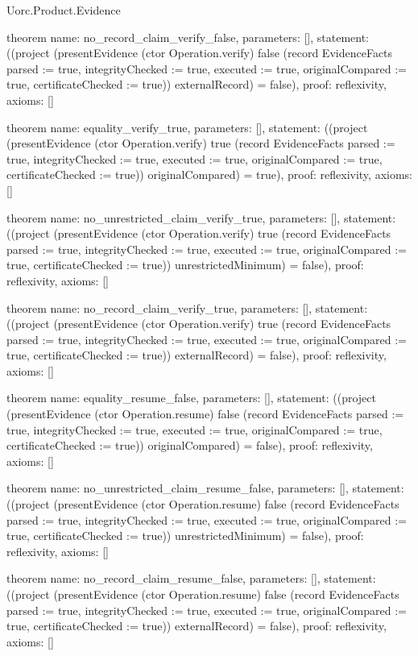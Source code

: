 \begin{lexlean}{Uorc.Product.Evidence}
\begin{semanticmodule}
theorem{
  name: no_record_claim_verify_false,
  parameters: [],
  statement: ((project (presentEvidence (ctor Operation.verify) false (record EvidenceFacts {parsed := true, integrityChecked := true, executed := true, originalCompared := true, certificateChecked := true})) externalRecord) = false),
  proof: reflexivity{},
  axioms: []
}

theorem{
  name: equality_verify_true,
  parameters: [],
  statement: ((project (presentEvidence (ctor Operation.verify) true (record EvidenceFacts {parsed := true, integrityChecked := true, executed := true, originalCompared := true, certificateChecked := true})) originalCompared) = true),
  proof: reflexivity{},
  axioms: []
}

theorem{
  name: no_unrestricted_claim_verify_true,
  parameters: [],
  statement: ((project (presentEvidence (ctor Operation.verify) true (record EvidenceFacts {parsed := true, integrityChecked := true, executed := true, originalCompared := true, certificateChecked := true})) unrestrictedMinimum) = false),
  proof: reflexivity{},
  axioms: []
}

theorem{
  name: no_record_claim_verify_true,
  parameters: [],
  statement: ((project (presentEvidence (ctor Operation.verify) true (record EvidenceFacts {parsed := true, integrityChecked := true, executed := true, originalCompared := true, certificateChecked := true})) externalRecord) = false),
  proof: reflexivity{},
  axioms: []
}

theorem{
  name: equality_resume_false,
  parameters: [],
  statement: ((project (presentEvidence (ctor Operation.resume) false (record EvidenceFacts {parsed := true, integrityChecked := true, executed := true, originalCompared := true, certificateChecked := true})) originalCompared) = false),
  proof: reflexivity{},
  axioms: []
}

theorem{
  name: no_unrestricted_claim_resume_false,
  parameters: [],
  statement: ((project (presentEvidence (ctor Operation.resume) false (record EvidenceFacts {parsed := true, integrityChecked := true, executed := true, originalCompared := true, certificateChecked := true})) unrestrictedMinimum) = false),
  proof: reflexivity{},
  axioms: []
}

theorem{
  name: no_record_claim_resume_false,
  parameters: [],
  statement: ((project (presentEvidence (ctor Operation.resume) false (record EvidenceFacts {parsed := true, integrityChecked := true, executed := true, originalCompared := true, certificateChecked := true})) externalRecord) = false),
  proof: reflexivity{},
  axioms: []
}


\end{semanticmodule}
\end{lexlean}
